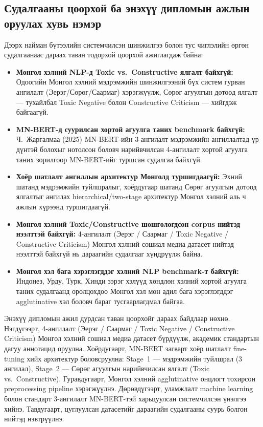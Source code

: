 \subsection{Судалгааны цоорхой ба энэхүү дипломын ажлын оруулах хувь нэмэр}

Дээрх найман бүтээлийн системчилсэн шинжилгээ болон тус чиглэлийн өргөн
судалгаанаас дараах таван тодорхой цоорхой ажиглагдаж байна:

\begin{itemize}
  \item \textbf{Монгол хэлний NLP-д Toxic vs.\ Constructive ялгалт байхгүй:}
        Одоогийн Монгол хэлний мэдрэмжийн шинжилгээний бүх систем гурван
        ангилалт (Эерэг/Сөрөг/Саармаг) хэрэгжүүлж, Сөрөг агуулгын дотоод
        ялгалт --- тухайлбал Toxic Negative болон Constructive Criticism ---
        хийгдэж байгаагүй.

  \item \textbf{MN-BERT-д суурилсан хортой агуулга таних benchmark байхгүй:}
        Ч.~Жаргалмаа (2025) MN-BERT-ийн 3-ангилалт мэдрэмжийн ангиллалтад
        үр дүнтэй болохыг нотолсон боловч нарийвчилсан 4-ангилалт хортой
        агуулга таних зорилгоор MN-BERT-ийг туршсан судалгаа байхгүй.

  \item \textbf{Хоёр шатлалт ангиллын архитектур Монголд туршигдаагүй:}
        Эхний шатанд мэдрэмжийн туйлшралыг, хоёрдугаар шатанд Сөрөг
        агуулгын дотоод ялгалтыг ангилах hierarchical/two-stage архитектур
        Монгол хэлний аль ч ажлын хүрээнд туршигдаагүй.

  \item \textbf{Монгол хэлний Toxic/Constructive шошгологдсон corpus нийтэд
        нээлттэй байхгүй:} 4-ангилалт (Эерэг / Саармаг / Toxic Negative /
        Constructive Criticism) Монгол хэлний сошиал медиа датасет нийтэд
        нээлттэй байхгүй нь дараагийн судалгааг хүндрүүлж байна.

  \item \textbf{Монгол хэл бага хэрэглэгддэг хэлний NLP benchmark-т байхгүй:}
        Индонез, Урду, Турк, Хинди зэрэг хэлүүд хөндлөн хэлний хортой агуулга
        таних судалгаанд оролцохдоо Монгол хэл мөн адил бага хэрэглэгддэг
        agglutinative хэл боловч бараг тусгаарлагдмал байгаа.
\end{itemize}

Энэхүү дипломын ажил дурдсан таван цоорхойг дараах байдлаар нөхнө. Нэгдүгээрт,
4-ангилалт (Эерэг / Саармаг / Toxic Negative / Constructive Criticism) Монгол
хэлний сошиал медиа датасет бүрдүүлж, академик стандартын дагуу аннотацид
оруулна. Хоёрдугаарт, MN-BERT загварт хоёр шатлалт fine-tuning хийх архитектур
боловсруулна: Stage~1 --- мэдрэмжийн туйлшрал (3 ангилал), Stage~2 --- Сөрөг
агуулгын нарийвчилсан ялгалт (Toxic vs.\ Constructive). Гуравдугаарт, Монгол
хэлний agglutinative онцлогт тохирсон preprocessing pipeline хэрэгжүүлнэ.
Дөрөвдүгээрт, уламжлалт machine learning болон стандарт 3-ангилалт MN-BERT-тэй
харьцуулсан системчилсэн үнэлгээ хийнэ. Тавдугаарт, цуглуулсан датасетийг
дараагийн судалгааны суурь болгон нийтэд нэвтрүүлнэ.

